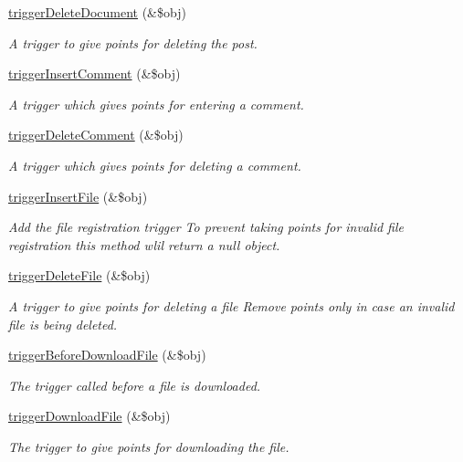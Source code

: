 \begin{DoxyCompactItemize}
\hyperlink{classpointController_a12526b69a68224eccbb3816e8724e4a4}{trigger\+Delete\+Document} (\&\$obj)
\begin{DoxyCompactList}\small\item\em A trigger to give points for deleting the post. \end{DoxyCompactList}\item 
\hyperlink{classpointController_adfd5758c92bb06d2b77ccc3ac432f0c1}{trigger\+Insert\+Comment} (\&\$obj)
\begin{DoxyCompactList}\small\item\em A trigger which gives points for entering a comment. \end{DoxyCompactList}\item 
\hyperlink{classpointController_ac6e1679b70da98f95a3a6cfe190a96f2}{trigger\+Delete\+Comment} (\&\$obj)
\begin{DoxyCompactList}\small\item\em A trigger which gives points for deleting a comment. \end{DoxyCompactList}\item 
\hyperlink{classpointController_a48e790691506d5c5a6feac45e7237e3d}{trigger\+Insert\+File} (\&\$obj)
\begin{DoxyCompactList}\small\item\em Add the file registration trigger To prevent taking points for invalid file registration this method wlil return a null object. \end{DoxyCompactList}\item 
\hyperlink{classpointController_a1d303c7b8ada6f84e53b5d32336bc313}{trigger\+Delete\+File} (\&\$obj)
\begin{DoxyCompactList}\small\item\em A trigger to give points for deleting a file Remove points only in case an invalid file is being deleted. \end{DoxyCompactList}\item 
\hyperlink{classpointController_afa504365e28861dc15a905c46e1f29e3}{trigger\+Before\+Download\+File} (\&\$obj)
\begin{DoxyCompactList}\small\item\em The trigger called before a file is downloaded. \end{DoxyCompactList}\item 
\hyperlink{classpointController_ab6a0e04cef3ea03a427a505ed829c027}{trigger\+Download\+File} (\&\$obj)
\begin{DoxyCompactList}\small\item\em The trigger to give points for downloading the file. \end{DoxyCompactList}\item 

\end{DoxyCompactItemize}
